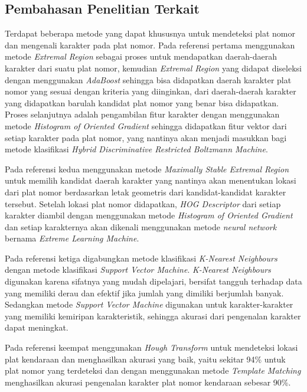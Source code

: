 \subsection{Pembahasan Penelitian Terkait}
\noindent Terdapat beberapa metode yang dapat khususnya untuk mendeteksi plat nomor dan mengenali karakter pada plat nomor.
\noindent Pada referensi pertama \cite{gou2016} menggunakan metode \textit{Extremal Region} sebagai proses untuk mendapatkan daerah-daerah karakter dari suatu plat nomor, kemudian \textit{Extremal Region} yang didapat diseleksi dengan menggunakan \textit{AdaBoost} sehingga bisa didapatkan daerah karakter plat nomor yang sesuai dengan kriteria yang diinginkan, dari daerah-daerah karakter yang didapatkan barulah kandidat plat nomor yang benar bisa didapatkan. Proses selanjutnya adalah pengambilan fitur karakter dengan menggunakan metode \textit{Histogram of Oriented Gradient} sehingga didapatkan fitur vektor dari setiap karakter pada plat nomor, yang nantinya akan menjadi masukkan bagi metode klasifikasi \textit{Hybrid Discriminative Restricted Boltzmann Machine}.

\noindent Pada referensi kedua \cite{gou2014} menggunakan metode \textit{Maximally Stable Extremal Region} untuk memilih kandidat daerah karakter yang nantinya akan menentukan lokasi dari plat nomor berdasarkan letak geometris dari kandidat-kandidat karakter tersebut. Setelah lokasi plat nomor didapatkan, \textit{HOG Descriptor} dari setiap karakter diambil dengan menggunakan metode \textit{Histogram of Oriented Gradient} dan setiap karakternya akan dikenali menggunakan metode \textit{neural network} bernama \textit{Extreme Learning Machine}.

\noindent Pada referensi ketiga \cite{tabrizi} digabungkan metode klasifikasi \textit{K-Nearest Neighbours} dengan metode klasifikasi \textit{Support Vector Machine}. \textit{K-Nearest Neighbours} digunakan karena sifatnya yang mudah dipelajari, bersifat tangguh terhadap data yang memiliki derau dan efektif jika jumlah yang dimiliki berjumlah banyak. Sedangkan metode \textit{Support Vector Machine} digunakan untuk karakter-karakter yang memiliki kemiripan karakteristik, sehingga akurasi dari pengenalan karakter dapat meningkat.

\noindent Pada referensi keempat \cite{rasheed} menggunakan \textit{Hough Transform} untuk mendeteksi lokasi plat kendaraan dan menghasilkan akurasi yang baik, yaitu sekitar 94\% untuk plat nomor yang terdeteksi dan dengan menggunakan metode \textit{Template Matching} menghasilkan akurasi pengenalan karakter plat nomor kendaraan sebesar 90\%.

